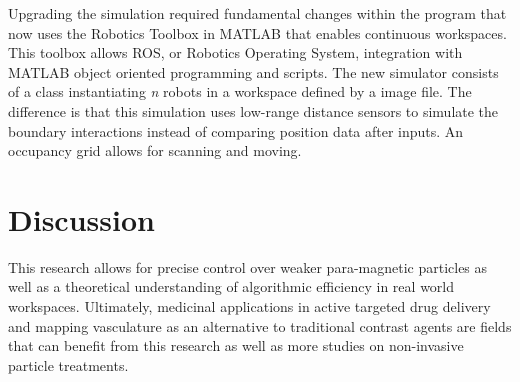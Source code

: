 \documentclass[letterpaper, 9 pt, conference]{ieeeconf}  %
\begin{document}
	Upgrading the simulation required fundamental changes within the program that now uses the Robotics Toolbox in MATLAB that enables continuous workspaces. This toolbox allows ROS, or Robotics Operating System, integration with MATLAB object oriented programming and scripts. The new simulator consists of a class instantiating \textit{n} robots in a workspace defined by a image file. The difference is that this simulation uses low-range distance sensors to simulate the boundary interactions instead of comparing position data after inputs. An occupancy grid allows for scanning and moving.
\section{Discussion}\label{sec:Discussion}
	This research allows for precise control over weaker para-magnetic particles as well as a theoretical understanding of algorithmic efficiency in real world workspaces. Ultimately, medicinal applications in active targeted drug delivery and mapping vasculature as an alternative to traditional contrast agents are fields that can benefit from this research as well as more studies on non-invasive particle treatments. 
\end{document}
